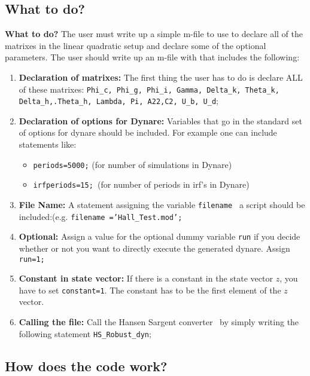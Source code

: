 \documentclass[letter, fleqn, 11pt]{article}
\begin{document}
\subsection{What to do?}

\textbf{What to do?} The user must write up a simple m-file to use to declare all of the matrixes in the linear quadratic setup and declare some
of the optional parameters. The user should write up an m-file with that includes the following:

\begin{enumerate}
\item \textbf{Declaration of matrixes:} The first thing the user has to do
is declare ALL of these matrixes: \texttt{Phi\_c, Phi\_g, Phi\_i, Gamma,
Delta\_k, Theta\_k, Delta\_h,.Theta\_h, Lambda, Pi, A22,C2, U\_b, U\_d};

\item \textbf{Declaration of options for Dynare: }Variables that go in the standard set of options for dynare should be included. For example
one can include statements like:

\begin{itemize}
\item \texttt{periods=5000;} (for number of simulations in Dynare)

\item \texttt{irfperiods=15; }(for number of periods in irf's in Dynare)
\end{itemize}

\item \textbf{File Name:} A statement assigning the variable \texttt{filename%
} a script should be included:(e.g. \texttt{filename ='Hall\_Test.mod';}

\item \textbf{Optional: }Assign a value for the optional dummy variable
\texttt{run} if you decide whether or not you want to directly execute the
generated dynare. Assign \texttt{run=1;}

\item \textbf{Constant in state vector: }If there is a constant in the state vector $z$, you have to set \texttt{constant=1}. The constant has to be the first element of the $z$ vector.

\item \textbf{Calling the file:} Call the Hansen Sargent converter \ by
simply writing the following statement \texttt{HS\_Robust\_dyn};\newpage
\end{enumerate}

\subsection{How does the code work?}
\end{document}
